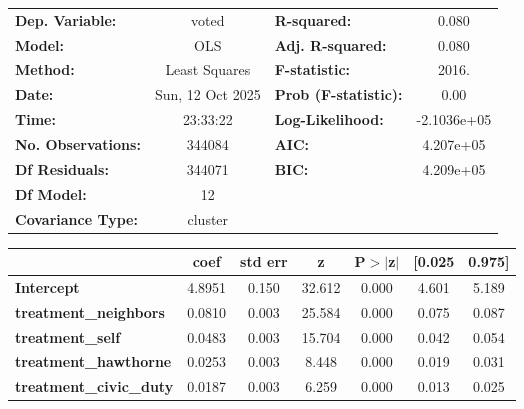 \begin{center}
\begin{tabular}{lclc}
\toprule
\textbf{Dep. Variable:}         &      voted       & \textbf{  R-squared:         } &      0.080   \\
\textbf{Model:}                 &       OLS        & \textbf{  Adj. R-squared:    } &      0.080   \\
\textbf{Method:}                &  Least Squares   & \textbf{  F-statistic:       } &      2016.   \\
\textbf{Date:}                  & Sun, 12 Oct 2025 & \textbf{  Prob (F-statistic):} &      0.00    \\
\textbf{Time:}                  &     23:33:22     & \textbf{  Log-Likelihood:    } & -2.1036e+05  \\
\textbf{No. Observations:}      &      344084      & \textbf{  AIC:               } &  4.207e+05   \\
\textbf{Df Residuals:}          &      344071      & \textbf{  BIC:               } &  4.209e+05   \\
\textbf{Df Model:}              &          12      & \textbf{                     } &              \\
\textbf{Covariance Type:}       &     cluster      & \textbf{                     } &              \\
\bottomrule
\end{tabular}
\begin{tabular}{lcccccc}
                                & \textbf{coef} & \textbf{std err} & \textbf{z} & \textbf{P$> |$z$|$} & \textbf{[0.025} & \textbf{0.975]}  \\
\midrule
\textbf{Intercept}              &       4.8951  &        0.150     &    32.612  &         0.000        &        4.601    &        5.189     \\
\textbf{treatment\_neighbors}   &       0.0810  &        0.003     &    25.584  &         0.000        &        0.075    &        0.087     \\
\textbf{treatment\_self}        &       0.0483  &        0.003     &    15.704  &         0.000        &        0.042    &        0.054     \\
\textbf{treatment\_hawthorne}   &       0.0253  &        0.003     &     8.448  &         0.000        &        0.019    &        0.031     \\
\textbf{treatment\_civic\_duty} &       0.0187  &        0.003     &     6.259  &         0.000        &        0.013    &        0.025     \\

\end{tabular}
\end{center}

